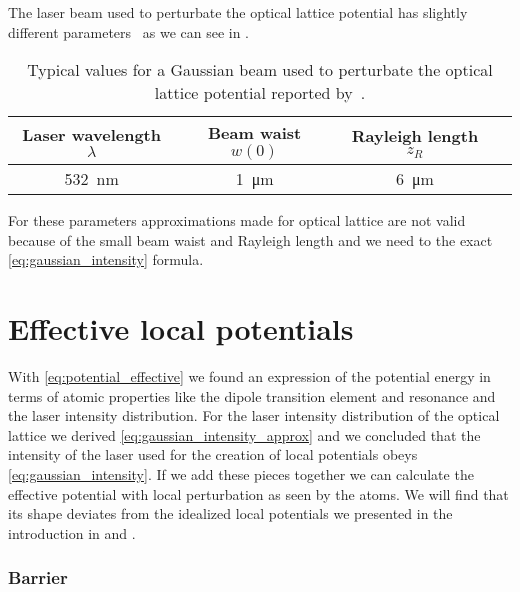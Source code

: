 The laser beam used to perturbate the optical lattice potential has slightly
different parameters~\cite{Hertlein2017} as we can see in
.
\begin{table}[ht]
  \centering
  \begin{tabular}{|c|c|c|c|}
    \hline
    Laser wavelength $\lambda$ &
    Beam waist $w(0)$ &
    Rayleigh length $z_R$ \\
    \hline
    \SI{532}{\nano\meter} &
    \SI{1}{\micro\meter} &
    \SI{6}{\micro\meter} \\
    \hline
  \end{tabular}
  \captionsetup{width=.8\textwidth}
  \caption{Typical values for a Gaussian beam used to perturbate the optical
    lattice potential reported by~\cite{Hertlein2017}.
  }\label{tab:gaussian_beam_perturbation}
\end{table}
For these parameters approximations made for optical lattice are not valid
because of the small beam waist and Rayleigh length and we need to the exact
\cref{eq:gaussian_intensity} formula.

\section{Effective local potentials}

With \cref{eq:potential_effective} we found an expression of the potential
energy in terms of atomic properties like the dipole transition element and
resonance and the laser intensity distribution. For the laser intensity
distribution of the optical lattice we derived
\cref{eq:gaussian_intensity_approx} and we concluded that the intensity of the
laser used for the creation of local potentials obeys
\cref{eq:gaussian_intensity}. If we add these pieces together we can calculate
the effective potential with local perturbation as seen by the atoms. We will
find that its shape deviates from the idealized local potentials we presented
in the introduction in  and 
.

\subsubsection{Barrier}

